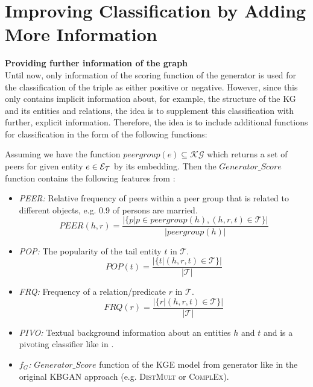 \section{Improving Classification by Adding More Information} 
\label{sec:improving_classification}

\textbf{Providing further information of the graph}\\
Until now, only information of the scoring function of the generator is used for the classification of the triple as either positive or negative.
However, since this only contains implicit information about, for example, the structure of the \ac{KG} and its entities and relations, the idea is to supplement this classification with further, explicit information.
Therefore, the idea is to include additional functions for classification in the form of the following functions: 

Assuming we have the function $peergroup(e) \subseteq \mathcal{KG}$ which returns a set of peers for given entity $e \in \mathcal{E}_{\mathcal{T}}$ by its embedding. 
Then the $Generator\_Score$ function contains the following features from \cite{arnaout2020enriching}:
\begin{itemize}
    \item 
    \emph{\ac{PEER}:} 
    Relative frequency of peers within a peer group that is related to different objects, e.g. 0.9 of persons are married. 
    \begin{equation}
        PEER(h,r) = \frac{|\{p | p \in peergroup(h), (h, r, t) \in \mathcal{T}\}|}{|peergroup(h)|}
    \end{equation}

    \item
    \emph{\ac{POP}:} 
    The popularity of the tail entity $t$ in $\mathcal{T}$. 
    \begin{equation}
        POP(t) = \frac{|\{t | (h, r , t) \in \mathcal{T}\}|}{|\mathcal{T}|}
    \end{equation}

    \item 
    \emph{\ac{FRQ}:} 
    Frequency of a relation/predicate $r$ in $\mathcal{T}$. 
    \begin{equation}
        FRQ(r) = \frac{|\{r | (h, r, t) \in \mathcal{T}\}|}{|\mathcal{T}|}
    \end{equation}
    
    \item 
    \emph{\ac{PIVO}:} 
    Textual background information about an entities $h$ and $t$ and is a pivoting classifier like in \cite{arnaout2020enriching}.
    
    \item 
    \emph{$f_G$:} 
    $Generator\_Score$ function of the \ac{KGE} model from generator like in the original \ac{KBGAN} approach (e.g. \textsc{DistMult}  or \textsc{ComplEx}).
\end{itemize}


